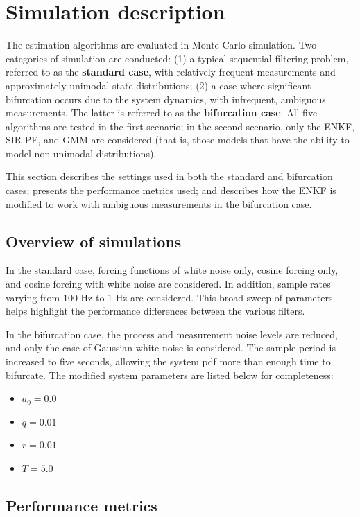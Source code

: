 \documentclass[]{article}
\begin{document}
\section{Simulation description}

The estimation algorithms are evaluated in Monte Carlo simulation. Two categories of simulation are conducted: (1) a typical sequential filtering problem, referred to as the \textbf{standard case}, with relatively frequent measurements and approximately unimodal state distributions; (2) a case where significant bifurcation occurs due to the system dynamics, with infrequent, ambiguous measurements. The latter is referred to as the \textbf{bifurcation case}. All five algorithms are tested in the first scenario; in the second scenario, only the ENKF, SIR PF, and GMM are considered (that is, those models that have the ability to model non-unimodal distributions).

This section describes the settings used in both the standard and bifurcation cases; presents the performance metrics used; and describes how the ENKF is modified to work with ambiguous measurements in the bifurcation case.

\subsection{Overview of simulations}

In the standard case, forcing functions of white noise only, cosine forcing only, and cosine forcing with white noise are considered. In addition, sample rates varying from 100 Hz to 1 Hz are considered. This broad sweep of parameters helps highlight the performance differences between the various filters.

In the bifurcation case, the process and measurement noise levels are reduced, and only the case of Gaussian white noise is considered. The sample period is increased to five seconds, allowing the system pdf more than enough time to bifurcate. The modified system parameters are listed below for completeness:
\begin{itemize}
\item $a_0 = 0.0$
\item $q = 0.01$
\item $r = 0.01$
\item $T = 5.0$
\end{itemize}

\subsection{Performance metrics}
\end{document}
